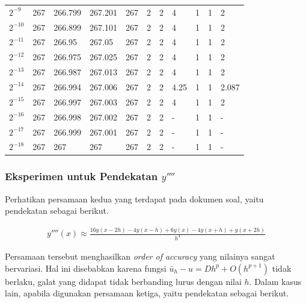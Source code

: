 \documentclass[10pt, a4paper, onecolumn, oneside, final]{report}
\begin{document}
\begin{table}[H]
\begin{tabular}{@{}lllllllllll@{}}
$2^{-9}$                   & 267                    & 266.799 & 267.201 & 267     & 2  & 2  & 4  & 1    & 1    & 2    \\
$2^{-10}$                   & 267                    & 266.899 & 267.101 & 267     & 2  & 2  & 4  & 1    & 1    & 2    \\
$2^{-11}$                   & 267                    & 266.95  & 267.05  & 267     & 2  & 2  & 4  & 1    & 1    & 2    \\
$2^{-12}$                   & 267                    & 266.975 & 267.025 & 267     & 2  & 2  & 4  & 1    & 1    & 2    \\
$2^{-13}$                   & 267                    & 266.987 & 267.013 & 267     & 2  & 2  & 4  & 1    & 1    & 2    \\
$2^{-14}$                   & 267                    & 266.994 & 267.006 & 267     & 2  & 2  & 4.25                      & 1    & 1    & 2.087                       \\
$2^{-15}$                   & 267                    & 266.997 & 267.003 & 267     & 2  & 2  & 4  & 1    & 1    & 2    \\
$2^{-16}$                   & 267                    & 266.998 & 267.002 & 267     & 2  & 2  & -                       & 1    & 1    & -  \\
$2^{-17}$                   & 267                    & 266.999 & 267.001 & 267     & 2  & 2  & -                       & 1    & 1    & -  \\
$2^{-18}$ & 267                    & 267     & 267     & 267     & 2  & 2  & -                       & 1    & 1    & - 
\end{tabular}
\end{table}

\subsubsection*{Eksperimen untuk Pendekatan $y''''$}

Perhatikan persamaan kedua yang terdapat pada dokumen soal, yaitu pendekatan sebagai berikut.

$$
\begin{aligned}
y''''(x) \approx \frac{16y(x-2h)-4y(x-h)+6y(x) - 4y(x+h) + y(x + 2h)}{h^4}
\end{aligned}
$$

Persamaan tersebut menghasilkan \textit{order of accuracy} yang nilainya sangat bervariasi. Hal ini disebabkan karena fungsi $\bar{u}_h - u = Dh^p + O(h^{p+1})$ tidak berlaku, galat yang didapat tidak berbanding lurus dengan nilai $h$. Dalam kasus lain, apabila digunakan persamaan ketiga, yaitu pendekatan sebagai berikut.
\end{document}
